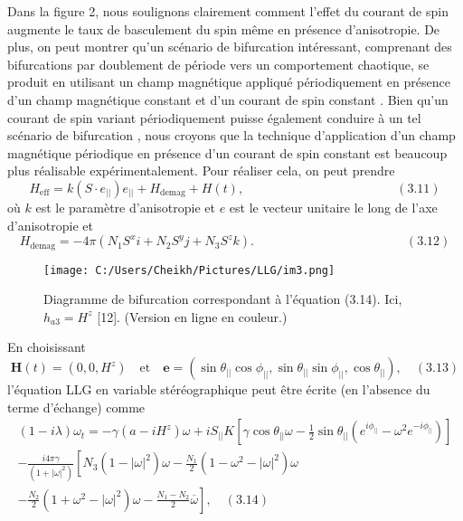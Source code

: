 \documentclass{article}
\begin{document}
	Dans la figure 2, nous soulignons clairement comment l'effet du courant de spin augmente le taux de basculement du spin même en présence d'anisotropie. De plus, on peut montrer qu'un scénario de bifurcation intéressant, comprenant des bifurcations par doublement de période vers un comportement chaotique, se produit en utilisant un champ magnétique appliqué périodiquement en présence d'un champ magnétique constant et d'un courant de spin constant \cite{ref10}. Bien qu'un courant de spin variant périodiquement puisse également conduire à un tel scénario de bifurcation \cite{ref11}, nous croyons que la technique d'application d'un champ magnétique périodique en présence d'un courant de spin constant est beaucoup plus réalisable expérimentalement. Pour réaliser cela, on peut prendre \cite{ref12}
	\[
	H_{\text{eff}} = k(S \cdot e_{||})e_{||} + H_{\text{demag}} + H(t),\qquad \qquad \qquad \qquad \qquad \qquad (3.11)
	\]
	où \(k\) est le paramètre d'anisotropie et \(e\) est le vecteur unitaire le long de l'axe d'anisotropie et
	\[
	H_{\text{demag}} = -4\pi(N_1S^{x}i + N_2S^{y}j + N_3S^{z}k). \qquad \qquad \qquad \qquad \qquad \qquad (3.12)
	\]
	
	
	\begin{figure}[htbp]
	\centering
	\texttt{[image: C:/Users/Cheikh/Pictures/LLG/im3.png]}
	\caption{Diagramme de bifurcation correspondant à l'équation (3.14). Ici, \(h_{a3} = H^{z}\) [12]. (Version en ligne en couleur.)
	}
	\label{fig:spin_evolution}
	\end{figure}

   En choisissant
   \[
   \mathbf{H}(t) = (0, 0, H^{z}) \quad \text{et} \quad \mathbf{e} = (\sin \theta_{||} \cos \phi_{||}, \sin \theta_{||} \sin \phi_{||}, \cos \theta_{||}), \quad (3.13)
   \]
   l'équation LLG en variable stéréographique peut être écrite (en l'absence
   du terme d'échange) comme \cite{ref10,ref12}
   \begin{multline}
   (1 - i\lambda)\omega_t = -\gamma(a - iH^z)\omega + iS_{||}K\left[\gamma \cos\theta_{||} \omega - \frac{1}{2} \sin\theta_{||}(e^{i\phi_{||}} - \omega^2 e^{-i\phi_{||}})\right] \\
   - \frac{i4\pi \gamma}{(1 + |\omega|^{2})}\left [N_3(1 - |\omega|^2)\omega - \frac{N_1}{2}(1 - \omega^2 - |\omega|^2)\omega  \right. \\
   \left. - \frac{N_2}{2}(1 + \omega^2 - |\omega|^2)\omega - \frac{N_1 - N_2}{2} \overline{\omega}\right], \quad (3.14)
   \end{multline}
   
\end{document}
